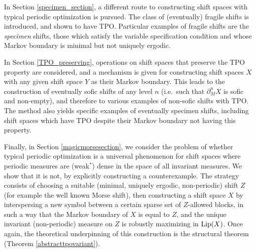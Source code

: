 \documentclass[reqno,11pt]{amsart}
\theoremstyle{definition}
\theoremstyle{remark}
\theoremstyle{remark}
\def\lip{{\rm Lip}}
\numberwithin{equation}{section}
\begin{document}
In Section \ref{specimen_section}, a different route to constructing shift spaces with typical periodic optimization is pursued.
The class of (eventually) fragile shifts is introduced, and shown to have TPO. Particular examples of fragile shifts are the \emph{specimen} shifts, those which satisfy the variable specification condition and whose Markov boundary is minimal but not uniquely ergodic.


In Section \ref{TPO_preserving}, operations on shift spaces that preserve the TPO property are considered,
and a mechanism is given for constructing shift spaces $X$ with any given shift space $Y$ as their Markov boundary.
This leads to the construction of eventually sofic shifts of any level $n$ (i.e.~such that $\partial_M^n X$ is sofic and non-empty), and therefore to various examples of non-sofic shifts with TPO.
The method also yields specific examples of eventually specimen shifts,
including shift spaces which have TPO despite their Markov boundary not having this property.

Finally, in Section \ref{magicmorsesection}, we 
consider the problem of whether typical periodic optimization is a universal phenomenon
for shift spaces where periodic measures are (weak$^*$) dense in the space of all invariant measures.
We show that it is not, by explicitly constructing a counterexample.
The strategy consists of choosing a suitable (minimal, uniquely ergodic, non-periodic) shift $Z$
(for example the well known Morse shift),
then constructing a shift space $X$ by interspersing a new symbol between a certain
sparse set of $Z$-allowed blocks, in such a way that the Markov boundary of $X$ is equal to $Z$,
and the unique invariant (non-periodic) measure on $Z$ is robustly maximizing in $\lip(X)$.
Once again, the theoretical underpinning of this construction is the structural theorem (Theorem \ref{abstracttpovariant}).
\end{document}
